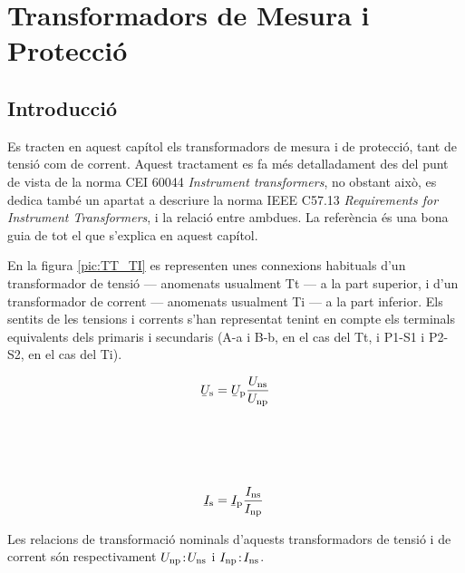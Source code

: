 \chapter{Transformadors de Mesura i Protecció}\label{sec:tr_mes_prot}


\section{Introducció}
Es tracten en aquest capítol els transformadors de
mesura i de protecció, tant de tensió com de corrent. Aquest
tractament es fa més detalladament des del punt de vista de la norma CEI 60044 \textit{Instrument transformers}, no obstant això, es dedica també un
apartat a descriure la norma  IEEE C57.13 \textit{Requirements for Instrument Transformers}, i la
relació entre ambdues. La referència \cite{KNU} és una bona guia de tot el que s'explica en aquest capítol.

En la figura \vref{pic:TT_TI} es representen unes connexions
habituals d'un transformador de tensió --- anomenats usualment Tt ---
 a la part superior, i d'un transformador de corrent --- anomenats
usualment Ti --- a la part inferior. Els sentits de les tensions
i corrents s'han representat tenint en compte els terminals
equivalents dels primaris i secundaris (\textsf{A-a} i \textsf{B-b}, en el cas del Tt, i \textsf{P1-S1} i \textsf{P2-S2}, en el cas del Ti).

\hfill
\begin{minipage}[b]{90mm}
    \hspace{1.5cm}
    
    \label{pic:TT_TI}
\end{minipage}
\hfill
\begin{minipage}[b][70mm][t]{50mm}
   \begin{align}
      \cmplx{U}\ped{s} &= \cmplx{U}\ped{p} \frac{U\ped{ns}}{U\ped{np}}
      \\[21mm]
      \cmplx{I}\ped{s} &= \cmplx{I}\ped{p} \frac{I\ped{ns}}{I\ped{np}}
   \end{align}
\end{minipage}

Les relacions de transformació nominals d'aquests transformadors de
tensió i de corrent són respectivament $U_\mathrm{np}\!:\!U_\mathrm{ns}$ i
$I_\mathrm{np}\!:\!I_\mathrm{ns}$.

